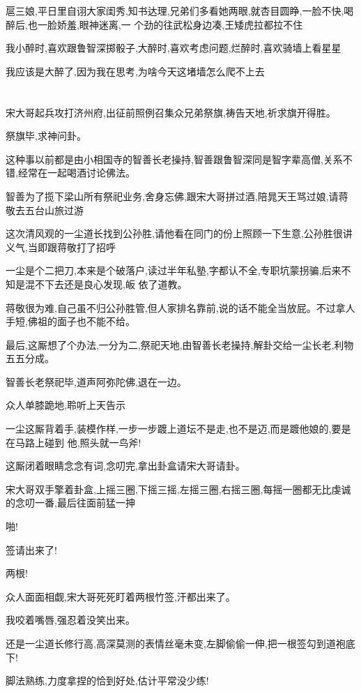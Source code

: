 ﻿\documentclass[12pt]{article}
\begin{document}
扈三娘,平日里自诩大家闺秀,知书达理,兄弟们多看她两眼,就杏目圆睁,一脸不快,喝醉后,也一脸娇羞,眼神迷离,一
个劲的往武松身边凑,王矮虎拉都拉不住

我小醉时,喜欢跟鲁智深掷骰子,大醉时,喜欢考虑问题,烂醉时,喜欢骑墙上看星星

我应该是大醉了,因为我在思考,为啥今天这堵墙怎么爬不上去
\section{}

宋大哥起兵攻打济州府,出征前照例召集众兄弟祭旗,祷告天地,祈求旗开得胜。

祭旗毕,求神问卦。

这种事以前都是由小相国寺的智善长老操持,智善跟鲁智深同是智字辈高僧,关系不错,经常在一起喝酒讨论佛法。

智善为了揽下梁山所有祭祀业务,舍身忘佛,跟宋大哥拼过酒,陪晁天王骂过娘,请蒋敬去五台山旅过游

这次清风观的一尘道长找到公孙胜,请他看在同门的份上照顾一下生意,公孙胜很讲义气,当即跟蒋敬打了招呼

一尘是个二把刀,本来是个破落户,读过半年私塾,字都认不全,专职坑蒙拐骗,后来不知是混不下去还是良心发现,皈
依了道教。

蒋敬很为难,自己虽不归公孙胜管,但人家排名靠前,说的话不能全当放屁。不过拿人手短,佛祖的面子也不能不给。

最后,这厮想了个办法,一分为二,祭祀天地,由智善长老操持,解卦交给一尘长老,利物五五分成。

智善长老祭祀毕,道声阿弥陀佛,退在一边。

众人单膝跪地,聆听上天告示

一尘这厮背着手,装模作样,一步一步踱上道坛\dldots 不是走,也不是迈,而是踱\dldots 他娘的,要是在马路上碰到
他,照头就一鸟斧!

这厮闭着眼睛念念有词,念叨完,拿出卦盒请宋大哥请卦。

宋大哥双手擎着卦盒,上摇三圈,下摇三摇,左摇三圈,右摇三圈,每摇一圈都无比虔诚的念叨一番,最后往面前猛一抻

啪!

签请出来了!

两根!

众人面面相觑,宋大哥死死盯着两根竹签,汗都出来了。

我咬着嘴唇,强忍着没笑出来。

还是一尘道长修行高,高深莫测的表情丝毫未变,左脚偷偷一伸,把一根签勾到道袍底下!

脚法熟练,力度拿捏的恰到好处,估计平常没少练!
\end{document}
